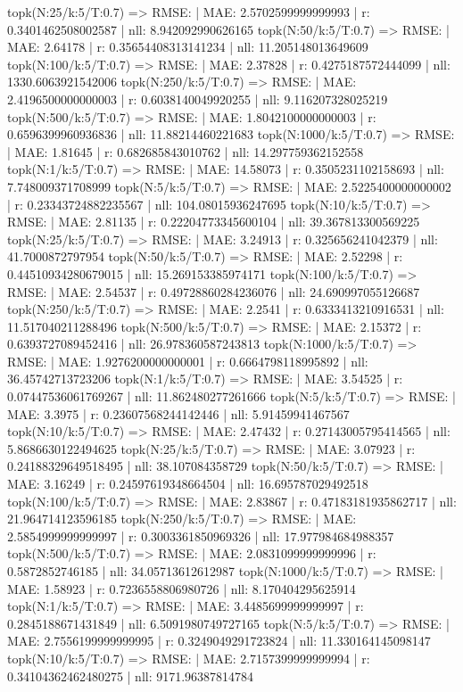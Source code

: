 topk(N:25/k:5/T:0.7) => RMSE: | MAE: 2.5702599999999993 | r: 0.3401462508002587 | nll: 8.942092990626165
topk(N:50/k:5/T:0.7) => RMSE: | MAE: 2.64178 | r: 0.35654408313141234 | nll: 11.205148013649609
topk(N:100/k:5/T:0.7) => RMSE: | MAE: 2.37828 | r: 0.4275187572444099 | nll: 1330.6063921542006
topk(N:250/k:5/T:0.7) => RMSE: | MAE: 2.4196500000000003 | r: 0.6038140049920255 | nll: 9.116207328025219
topk(N:500/k:5/T:0.7) => RMSE: | MAE: 1.8042100000000003 | r: 0.6596399960936836 | nll: 11.88214460221683
topk(N:1000/k:5/T:0.7) => RMSE: | MAE: 1.81645 | r: 0.682685843010762 | nll: 14.297759362152558
topk(N:1/k:5/T:0.7) => RMSE: | MAE: 14.58073 | r: 0.3505231102158693 | nll: 7.748009371708999
topk(N:5/k:5/T:0.7) => RMSE: | MAE: 2.5225400000000002 | r: 0.23343724882235567 | nll: 104.08015936247695
topk(N:10/k:5/T:0.7) => RMSE: | MAE: 2.81135 | r: 0.22204773345600104 | nll: 39.367813300569225
topk(N:25/k:5/T:0.7) => RMSE: | MAE: 3.24913 | r: 0.325656241042379 | nll: 41.7000872797954
topk(N:50/k:5/T:0.7) => RMSE: | MAE: 2.52298 | r: 0.44510934280679015 | nll: 15.269153385974171
topk(N:100/k:5/T:0.7) => RMSE: | MAE: 2.54537 | r: 0.49728860284236076 | nll: 24.690997055126687
topk(N:250/k:5/T:0.7) => RMSE: | MAE: 2.2541 | r: 0.6333413210916531 | nll: 11.517040211288496
topk(N:500/k:5/T:0.7) => RMSE: | MAE: 2.15372 | r: 0.6393727089452416 | nll: 26.978360587243813
topk(N:1000/k:5/T:0.7) => RMSE: | MAE: 1.9276200000000001 | r: 0.6664798118995892 | nll: 36.45742713723206
topk(N:1/k:5/T:0.7) => RMSE: | MAE: 3.54525 | r: 0.07447536061769267 | nll: 11.862480277261666
topk(N:5/k:5/T:0.7) => RMSE: | MAE: 3.3975 | r: 0.23607568244142446 | nll: 5.91459941467567
topk(N:10/k:5/T:0.7) => RMSE: | MAE: 2.47432 | r: 0.27143005795414565 | nll: 5.8686630122494625
topk(N:25/k:5/T:0.7) => RMSE: | MAE: 3.07923 | r: 0.24188329649518495 | nll: 38.107084358729
topk(N:50/k:5/T:0.7) => RMSE: | MAE: 3.16249 | r: 0.24597619348664504 | nll: 16.695787029492518
topk(N:100/k:5/T:0.7) => RMSE: | MAE: 2.83867 | r: 0.47183181935862717 | nll: 21.964714123596185
topk(N:250/k:5/T:0.7) => RMSE: | MAE: 2.5854999999999997 | r: 0.3003361850969326 | nll: 17.977984684988357
topk(N:500/k:5/T:0.7) => RMSE: | MAE: 2.0831099999999996 | r: 0.5872852746185 | nll: 34.05713612612987
topk(N:1000/k:5/T:0.7) => RMSE: | MAE: 1.58923 | r: 0.7236558806980726 | nll: 8.170404295625914
topk(N:1/k:5/T:0.7) => RMSE: | MAE: 3.4485699999999997 | r: 0.2845188671431849 | nll: 6.5091980749727165
topk(N:5/k:5/T:0.7) => RMSE: | MAE: 2.7556199999999995 | r: 0.3249049291723824 | nll: 11.330164145098147
topk(N:10/k:5/T:0.7) => RMSE: | MAE: 2.7157399999999994 | r: 0.34104362462480275 | nll: 9171.96387814784
